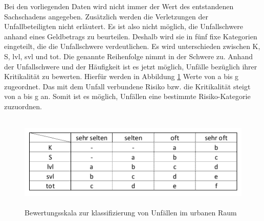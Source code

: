 Bei den vorliegenden Daten wird nicht immer der Wert des entstandenen Sachschadens angegeben. Zusätzlich werden die Verletzungen der Unfallbeteiligten nicht erläutert. Es ist also nicht möglich, die Unfallschwere anhand eines Geldbetrags zu beurteilen. Deshalb wird sie in fünf fixe Kategorien eingeteilt, die die Unfallschwere verdeutlichen. Es wird unterschieden zwischen \ac{K}, \ac{S}, \ac{lvl}, \ac{svl} und \ac{tot}. Die genannte Reihenfolge nimmt in der Schwere zu. Anhand der Unfallschwere und der Häufigkeit ist es jetzt möglich, Unfälle bezüglich ihrer Kritikalität zu bewerten. Hierfür werden in Abbildung \ref{fig:Bewertungsskala} Werte von a bis g zugeordnet. Das mit dem Unfall verbundene Risiko bzw. die Kritikalität steigt von a bis g an. Somit ist es möglich, Unfällen eine bestimmte Risiko-Kategorie zuzuordnen.

\begin{savenotes}
	\begin{figure}[H]
		\centering
		\includegraphics[width=16cm,height=4.5cm]{figures/Bewertungsskala}
		\caption[Bewertungsskala zur klassifizierung von Unfällen im urbanen Raum]{Bewertungsskala zur klassifizierung von Unfällen im urbanen Raum}\label{fig:Bewertungsskala}
	\end{figure}
\end{savenotes}

